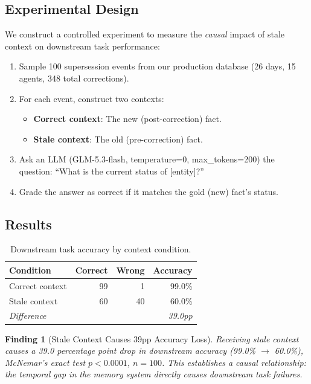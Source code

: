 \documentclass{article}
\newtheorem{finding}{Finding}
\begin{document}
\subsection{Experimental Design}

We construct a controlled experiment to measure the \emph{causal} impact of stale context on downstream task performance:

\begin{enumerate}
\item Sample 100 supersession events from our production database (26 days, 15 agents, 348 total corrections).
\item For each event, construct two contexts:
  \begin{itemize}
  \item \textbf{Correct context}: The new (post-correction) fact.
  \item \textbf{Stale context}: The old (pre-correction) fact.
  \end{itemize}
\item Ask an LLM (GLM-5.3-flash, temperature=0, max\_tokens=200) the question: ``What is the current status of [entity]?''
\item Grade the answer as correct if it matches the gold (new) fact's status.
\end{enumerate}

\subsection{Results}

\begin{table}[h]
\centering
\caption{Downstream task accuracy by context condition.}
\begin{tabular}{lrrr}
\toprule
Condition & Correct & Wrong & Accuracy \\
\midrule
Correct context & 99 & 1 & 99.0\% \\
Stale context & 60 & 40 & 60.0\% \\
\midrule
\emph{Difference} & & & \emph{39.0pp} \\
\bottomrule
\end{tabular}
\label{tab:downstream}
\end{table}

\begin{finding}[Stale Context Causes 39pp Accuracy Loss]
Receiving stale context causes a 39.0 percentage point drop in downstream accuracy (99.0\% $\to$ 60.0\%), McNemar's exact test $p < 0.0001$, $n{=}100$. This establishes a \emph{causal} relationship: the temporal gap in the memory system directly causes downstream task failures.
\end{finding}
\end{document}
